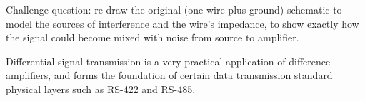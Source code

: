 \vskip 10pt

Challenge question: re-draw the original (one wire plus ground) schematic to model the sources of interference and the wire's impedance, to show exactly how the signal could become mixed with noise from source to amplifier.







Differential signal transmission is a very practical application of difference amplifiers, and forms the foundation of certain data transmission standard physical layers such as RS-422 and RS-485.




